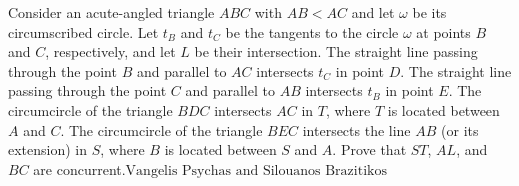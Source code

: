 Consider an acute-angled triangle $ABC$  with $AB<AC$ and let $\omega$ be its circumscribed circle.  Let $t_B$ and $t_C$ be the tangents to the circle $\omega$ at points $B$ and $C$,  respectively, and let $L$ be their intersection.  The straight line passing through the point $B$ and parallel to $AC$ intersects $t_C$ in point $D$.  The straight line passing through the point $C$ and parallel to $AB$ intersects $t_B$ in point $E$.  The circumcircle of the triangle $BDC$ intersects $AC$ in $T$,  where $T$ is located between $A$ and $C$.  The circumcircle of the triangle $BEC$ intersects the line $AB$ (or its extension) in $S$,  where $B$ is located between $S$ and $A$. Prove that $ST$,  $AL$,  and $BC$ are concurrent.$\text{Vangelis Psychas and Silouanos Brazitikos}$